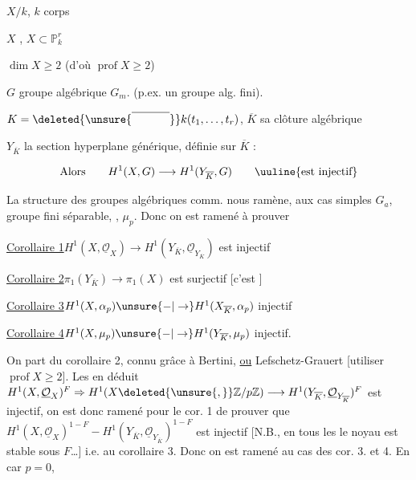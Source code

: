 \qquad $X/k$, $k$ corps 

$X$  , $X\subset\mathbb P^{r}_{k}$

 $\dim X\geq2$ (d'où $\operatorname{prof}X\geq2$)

$G$ groupe algébrique   $G_{m}$. (p.ex. un groupe alg. fini).

$K=\deleted{\unsure{\overline{\phantom{k(t_1,t_r)}}}}k(t_{1},\ldots,t_{r})$, $\overline K$ sa clôture algébrique

$Y_{\overline K}$ la section hyperplane générique, définie sur $\overline K$ :

\[
\text{Alors}\qquad H^{1}(X,G)\longrightarrow H^{1}(Y_{\overline K},G)\qquad\text{\uuline{est injectif}}
\]

La structure des groupes algébriques comm. nous ramène, aux cas simples $G_{a}$,  groupe fini séparable, , $\mu_{p}$. Donc on est ramené à prouver


\uline{Corollaire 1}\qquad $H^{1}(X,\underline{\mathcal O}_{X})\longrightarrow H^{1}(Y_{\overline K},\underline{\mathcal O}_{Y_{\overline K}})$ est injectif


\uline{Corollaire 2}\qquad $\pi_{1}(Y_{\overline K})\longrightarrow\pi_{1}(X)$ est surjectif [c'est ]

\uline{Corollaire 3}\qquad $H^{1}(X,\alpha_{p})\unsure{-|\to}H^{1}(X_{\overline K},\alpha_{p})$ injectif

\uline{Corollaire 4}\qquad $H^{1}(X,\mu_{p})\unsure{-|\to}H^{1}(Y_{\overline K},\mu_{p})$ injectif.

On part du corollaire 2, connu grâce à Bertini, \uline{ou} Lefschetz-Grauert [utiliser  $\operatorname{prof}X\geq2$]. Les en déduit $H^{1}(X,\underline{\mathcal O}_{X})^{F}\Rightarrow H^{1}(X\deleted{\unsure{,}}\mathbb Z/p\mathbb Z)\longrightarrow H^{1}(Y_{\overline K},\underline{\mathcal O}_{Y_{\overline K}})^{F}$ est injectif, on est donc ramené pour le cor. 1 de prouver que $H^{1}(X,\underline{\mathcal O}_{X})^{1-F}-H^{1}(Y_{\overline K},\underline{\mathcal O}_{Y_{\overline K}})^{1-F}$ est injectif [N.B., en tous les \unsure{;} le noyau est stable sous $F$\ldots] i.e. au corollaire 3. Donc on est ramené \inserted{[en car. $p>0$]}  au cas des cor. 3. et 4. En car $p=0$,


